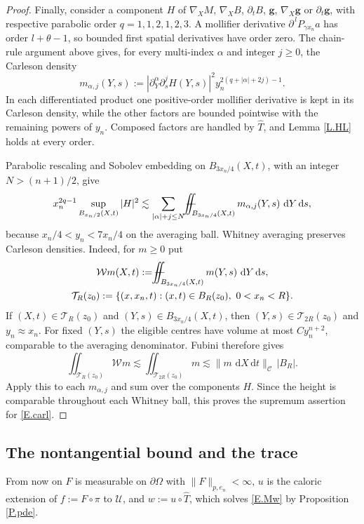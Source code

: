 \documentclass[12pt,leqno]{amsart}
\numberwithin{equation}{section}
\newcommand{\pom}{\partial\Omega}
\newcommand{\pd}{\partial}
\newcommand{\Uc}{\mathcal U}
\newcommand{\Cc}{\mathcal C}
\renewcommand{\d}{\,\mathrm d}
\newcommand{\Cnorm}[1]{\|#1\|_{\Cc}}
\def\Yint#1{\mathchoice
	{\YYint\displaystyle\textstyle{#1}}%
	{\YYint\textstyle\scriptstyle{#1}}%
	{\YYint\scriptstyle\scriptscriptstyle{#1}}%
	{\YYint\scriptscriptstyle\scriptscriptstyle{#1}}%
	\!\dint}
\newcommand{\dint}{\int\!\!\!\!\!\int}
\def\YYint#1#2#3{{\setbox0=\hbox{$#1{#2#3}{\iint}$}
		\vcenter{\hbox{$#2#3$}}\kern-.51\wd0}}
\def\longdash{\mkern-1.5mu{-}\mkern-7.5mu{-}}
\def\fiint{\Yint\longdash}
\theoremstyle{plain}
\theoremstyle{remark}
\begin{document}
\begin{proof}
Finally, consider a component $H$ of
$\nabla_XM$, $\nabla_XB$, $\pd_tB$, $\mathbf g$,
$\nabla_X\mathbf g$ or $\pd_t\mathbf g$, with respective parabolic order
$q=1,1,2,1,2,3$. A mollifier derivative
$\pd^{\,l}P_{\gamma x_n}a$ has order $l+\theta-1$, so bounded first
spatial derivatives have order zero. The chain-rule argument above gives,
for every multi-index $\alpha$ and integer $j\ge0$, the Carleson density
\[
 m_{\alpha,j}(Y,s):=
 |\pd_Y^\alpha\pd_s^jH(Y,s)|^2y_n^{2(q+|\alpha|+2j)-1}.
\]
In each differentiated product one positive-order mollifier derivative is
kept in its Carleson density, while the other factors are bounded pointwise
with the remaining powers of $y_n$. Composed factors are handled by
$\widehat T$, and Lemma \ref{L.HL} holds at every order.\medskip

\noindent Parabolic rescaling and Sobolev embedding on
$B_{3x_n/4}(X,t)$, with an integer $N>(n+1)/2$, give
\[
 x_n^{2q-1}\sup_{B_{x_n/2}(X,t)}|H|^2
 \lesssim\sum_{|\alpha|+j\le N}
       \fiint_{B_{3x_n/4}(X,t)}m_{\alpha,j}(Y,s)\,\d Y\d s,
\]
because $x_n/4<y_n<7x_n/4$ on the averaging ball.
Whitney averaging preserves Carleson densities. Indeed, for $m\ge0$ put
\[
 \begin{gathered}
 \mathcal Wm(X,t):=\fiint_{B_{3x_n/4}(X,t)}m(Y,s)\,\d Y\d s,\\
 \mathcal T_R(z_0):=\{(x,x_n,t):(x,t)\in B_R(z_0),\ 0<x_n<R\}.
 \end{gathered}
\]
If $(X,t)\in\mathcal T_R(z_0)$ and $(Y,s)\in B_{3x_n/4}(X,t)$, then
$(Y,s)\in\mathcal T_{2R}(z_0)$ and $y_n\approx x_n$. For fixed $(Y,s)$
the eligible centres have volume at most $Cy_n^{n+2}$, comparable to the
averaging denominator. Fubini therefore gives
\[
 \iint_{\mathcal T_R(z_0)}\mathcal Wm
 \lesssim\iint_{\mathcal T_{2R}(z_0)}m
 \lesssim\Cnorm{m\,\d X\d t}\,|B_R|.
\]
Apply this to each $m_{\alpha,j}$ and sum over the components $H$.
Since the height is comparable throughout each Whitney ball, this proves
the supremum assertion for \eqref{E.carl}.
\end{proof}

\subsection{The nontangential bound and the trace}\label{ss.trace}

From now on $F$ is measurable on $\pom$ with $\|F\|_{p,e_n}<\infty$, $u$ is the
caloric extension of $f:=F\circ\pi$ to $\Uc$, and $w:=u\circ\widehat T$, which
solves \eqref{E.Mw} by Proposition \ref{P.pde}.
\end{document}
